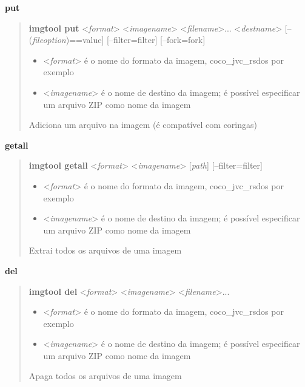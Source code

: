 \documentclass[letterpaper,10pt,brazil]{sphinxmanual}
\begin{document}
\textbf{put}
\begin{quote}

\textbf{imgtool put} \textless{}\emph{format}\textgreater{} \textless{}\emph{imagename}\textgreater{} \textless{}\emph{filename}\textgreater{}... \textless{}\emph{destname}\textgreater{} {[}--(\emph{fileoption})==value{]} {[}--filter=filter{]} {[}--fork=fork{]}
\begin{itemize}
\item {} 
\textless{}\emph{format}\textgreater{} é o nome do formato da imagem, coco\_jvc\_rsdos por exemplo

\item {} 
\textless{}\emph{imagename}\textgreater{} é o nome de destino da imagem; é possível especificar um arquivo ZIP como nome da imagem

\end{itemize}

Adiciona um arquivo na imagem (é compatível com coringas)
\end{quote}

\textbf{getall}
\begin{quote}

\textbf{imgtool getall} \textless{}\emph{format}\textgreater{} \textless{}\emph{imagename}\textgreater{} {[}\emph{path}{]} {[}--filter=filter{]}
\begin{itemize}
\item {} 
\textless{}\emph{format}\textgreater{} é o nome do formato da imagem, coco\_jvc\_rsdos por exemplo

\item {} 
\textless{}\emph{imagename}\textgreater{} é o nome de destino da imagem; é possível especificar um arquivo ZIP como nome da imagem

\end{itemize}

Extrai todos os arquivos de uma imagem
\end{quote}

\textbf{del}
\begin{quote}

\textbf{imgtool del} \textless{}\emph{format}\textgreater{} \textless{}\emph{imagename}\textgreater{} \textless{}\emph{filename}\textgreater{}...
\begin{itemize}
\item {} 
\textless{}\emph{format}\textgreater{} é o nome do formato da imagem, coco\_jvc\_rsdos por exemplo

\item {} 
\textless{}\emph{imagename}\textgreater{} é o nome de destino da imagem; é possível especificar um arquivo ZIP como nome da imagem

\end{itemize}

Apaga todos os arquivos de uma imagem
\end{quote}
\end{document}
